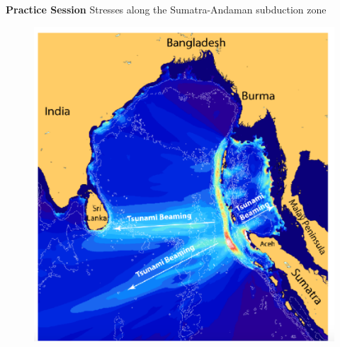\documentclass[11pt]{beamer}
\begin{document}
\begin{frame}{\textbf{Practice Session}}
    \large{Stresses along the Sumatra-Andaman subduction zone}
    \begin{figure}
        \includegraphics[width=0.6\linewidth]{images/sumatra_0}
    \end{figure}
\end{frame}
\end{document}
